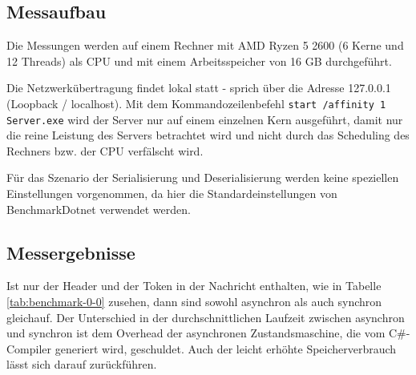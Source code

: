 \subsection{Messaufbau}
\label{subsec:messaufbau}

Die Messungen werden auf einem Rechner mit AMD Ryzen 5 2600 (6 Kerne und 12 Threads) als CPU und mit einem Arbeitsspeicher von 16 GB durchgeführt.

Die Netzwerkübertragung findet lokal statt - sprich über die Adresse 127.0.0.1 (Loopback / localhost). Mit dem Kommandozeilenbefehl \texttt{start /affinity 1 Server.exe} wird der Server nur auf einem einzelnen Kern ausgeführt, damit nur die reine Leistung des Servers betrachtet wird und nicht durch das Scheduling des Rechners bzw. der CPU verfälscht wird.

Für das Szenario der Serialisierung und Deserialisierung werden keine speziellen Einstellungen vorgenommen, da hier die Standardeinstellungen von BenchmarkDotnet verwendet werden.

\subsection{Messergebnisse}
\label{subsec:messergebnisse}

\begin{table}[h]
    \caption{Benchmark mit 0 Options und mit einer Payload von 0 Bytes}
    \label{tab:benchmark-0-0}
\end{table}

Ist nur der Header und der Token in der Nachricht enthalten, wie in Tabelle \ref{tab:benchmark-0-0} zusehen, dann sind sowohl asynchron als auch synchron gleichauf. Der Unterschied in der durchschnittlichen Laufzeit zwischen asynchron und synchron ist dem Overhead der asynchronen Zustandsmaschine, die vom C\#-Compiler generiert wird, geschuldet. Auch der leicht erhöhte Speicherverbrauch lässt sich darauf zurückführen.

